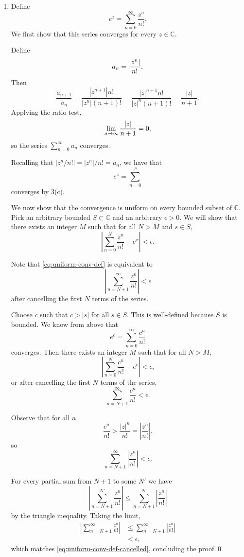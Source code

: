 \documentclass[oneside]{article}
\newcommand\abs[1]{\left|#1\right|}
\newcommand\bbC{\mathbb{C}}
\begin{document}
  \begin{enumerate}[label=\textbf{(\alph*)}]
    \item Define \[
      e^z = \sum_{n=0}^\infty \frac{z^n}{n!}\text{.}
    \]
    We first show that this series converges for every $z \in \bbC$.

    Define \[
      a_n = \frac{\abs{z^n}}{n!} \text.
    \] Then\[
      \frac{a_{n+1}}{a_n}
      = \frac{\abs{z^{n+1}}n!}{\abs{z^n}(n+1)!}
      = \frac{\abs{z}^{n+1}n!}{\abs{z}^n(n+1)!}
      = \frac{\abs{z}}{n+1} \text{.}
    \] Applying the ratio test,\[
      \lim_{n\to\infty} \frac{\abs{z}}{n+1} = 0\text,
    \] so the series $\sum_{n=0}^\infty a_n$ converges.

    Recalling that $\abs{z^n / n!} = \abs{z^n}/n! = a_n$, we have that \[
      e^z = \sum_{n=0}^{z^n}
    \] converges by 3(c).

    We now show that the convergence is uniform on every bounded subset of
    $\bbC$. Pick an arbitrary bounded $S \subset \bbC$ and an arbitrary
    $\epsilon > 0$. We will show that there exists an integer $M$ such that
    for all $N > M$ and $s \in S$, \begin{equation} \label{eq:uniform-conv-def}
      \abs{\sum_{n=0}^N\frac{z^n}{n!} - e^x} < \epsilon \text{.}
    \end{equation}

    Note that \eqref{eq:uniform-conv-def} is equivalent to \begin{equation}
      \label{eq:uniform-conv-def-cancelled}
      \abs{\sum_{n=N+1}^\infty\frac{z^n}{n!}} < \epsilon
    \end{equation} after cancelling the first $N$ terms of the series.

    Choose $c$ such that $c > \abs{s}$ for all $s \in S$. This is well-defined
    because $S$ is bounded. We know from above that \[
      e^c = \sum_{n=0}^\infty \frac{c^n}{n!}
    \] converges. Then there exists an integer $M$ such that for all $N > M$,\[
      \abs{\sum_{n=0}^N \frac{c^n}{n!} - e^c} < \epsilon \text{,}
    \] or after cancelling the first $N$ terms of the series,\[
      \sum_{n=N+1}^\infty \frac{c^n}{n!} < \epsilon \text{.}
    \]

    Observe that for all $n$, \[
      \frac{c^n}{n!} > \frac{\abs{z}^n}{n!} = \abs{\frac{z^n}{n!}}\text{,}
    \] so \[
      \sum_{n=N+1}^\infty \abs{\frac{z^n}{n!}} < \epsilon \text{.}
    \]

    For every partial sum from $N+1$ to some $N'$ we have\[
      \abs{\sum_{n=N+1}^{N'} \frac{z^n}{n!}}
      \leq \sum_{n=N+1}^{N'} \abs{\frac{z^n}{n!}}
    \] by the triangle inequality. Taking the limit, \begin{align*}
      \abs{\sum_{n=N+1}^\infty \frac{z^n}{n!}}
      &\leq \sum_{n=N+1}^\infty \abs{\frac{z^n}{n!}} \\
      &< \epsilon\text{,}
    \end{align*} which matches \eqref{eq:uniform-conv-def-cancelled}, concluding
    the proof.\qed


\end{enumerate}
\end{document}
